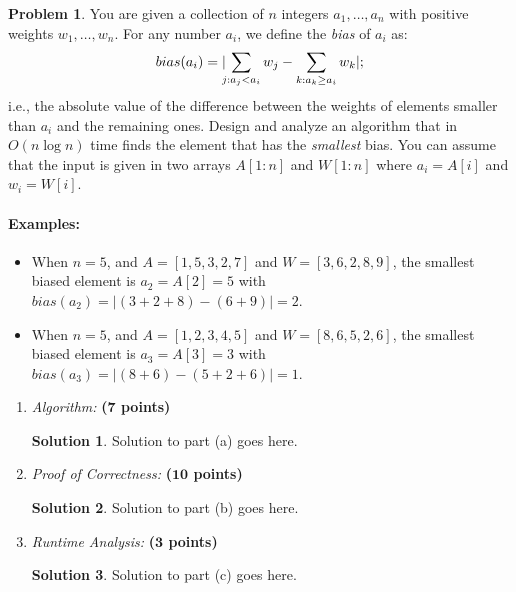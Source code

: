 \documentclass{article}
\theoremstyle{definition}
\newtheorem{problem}{Problem}
\newtheorem*{solution*}{Solution}
\newenvironment{solution}{\begin{solution*}}{{} \end{solution*}}
\newcommand{\grade}[1]{\hfill{\textbf{($\mathbf{#1}$ points)}}}
\begin{document}
\begin{problem}\label{sort}
	You are given a collection of $n$ integers $a_1,\ldots,a_n$ with positive weights $w_1,\ldots,w_n$. For any number $a_i$, we define the \emph{bias} of $a_i$ as:
	\[
		bias(a_i) = |\hspace{-0.1cm}{\sum_{j: a_j < a_i} w_j} - \sum_{k: a_k \geq a_i} w_k|;
	\]
	i.e., the absolute value of the difference between the weights of elements smaller than $a_i$ and the remaining ones. 
	Design and analyze an algorithm that in $O(n\log{n})$ time 
	finds the element that has the \emph{smallest} bias. You can assume that the input is given in two arrays $A[1:n]$ and $W[1:n]$ where $a_i = A[i]$ and $w_i = W[i]$.  

	
	\paragraph{Examples:} 
	\begin{itemize}
	\item When $n=5$, and $A = [1,5,3,2,7]$ and $W=[3,6,2,8,9]$, the smallest biased element is $a_2 = A[2] = 5$ with $bias(a_2) = |(3+2+8)-(6+9)| = 2$.   
	\item When $n=5$, and $A = [1,2,3,4,5]$ and $W=[8,6,5,2,6]$, the smallest biased element is $a_3 = A[3] = 3$ with $bias(a_3) = |(8+6)-(5+2+6)| = 1$. 
	\end{itemize}
	
	\begin{enumerate}[label=(\alph*)]
		\item \emph{Algorithm:} \grade{7}
	
	\bigskip	
	\begin{solution}
	Solution to part (a) goes here. 
	\end{solution}
	
		\newpage
		\item \emph{Proof of Correctness:} \grade{10}
		
		\bigskip	
	\begin{solution}
	Solution to part (b) goes here. 
	\end{solution}
	
	
		\item \emph{Runtime Analysis:} \grade{3}
		
		\bigskip	
	\begin{solution}
	Solution to part (c) goes here. 
	\end{solution}
	
		
	\end{enumerate}
\end{problem}
\newpage
\end{document}
